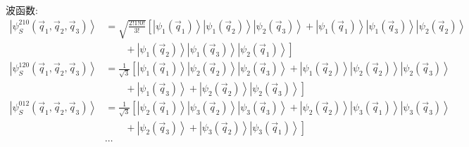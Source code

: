 \begin{frame}[label=current]
  \frametitle{}
  波函数:
  \[\begin{aligned}
    \left\vert \psi ^{210}_S(\vec{q}_1,\vec{q}_2,\vec{q}_3) \right\rangle 
    &= \sqrt{\frac{2!1!0!}{3!}} \left[\left\vert \psi _1(\vec{q}_1)\right\rangle \left\vert \psi _1(\vec{q}_2)\right\rangle \left\vert \psi _2(\vec{q}_3)\right\rangle 
    + \left\vert \psi _1(\vec{q}_1)\right\rangle \left\vert \psi _1(\vec{q}_3)\right\rangle \left\vert \psi _2(\vec{q}_2)\right\rangle \right. \\
    &  \left.\qquad + \left\vert \psi _1(\vec{q}_2)\right\rangle \left\vert \psi _1(\vec{q}_3)\right\rangle \left\vert \psi _2(\vec{q}_1)\right\rangle
    \right]\\  
    \left\vert \psi ^{120}_S(\vec{q}_1,\vec{q}_2,\vec{q}_3) \right\rangle 
    &= \frac{1}{\sqrt{3}} \left[\left\vert \psi _1(\vec{q}_1)\right\rangle \left\vert \psi _2(\vec{q}_2)\right\rangle \left\vert \psi _2(\vec{q}_3)\right\rangle 
    + \left\vert \psi _1(\vec{q}_2)\right\rangle \left\vert \psi _2(\vec{q}_2)\right\rangle \left\vert \psi _2(\vec{q}_3)\right\rangle \right. \\
    &  \left.\qquad + \left\vert \psi _1(\vec{q}_3)\right\rangle 
    + \left\vert \psi _2(\vec{q}_2)\right\rangle \left\vert \psi _2(\vec{q}_3)\right\rangle 
    \right]\\
    \left\vert \psi ^{012}_S(\vec{q}_1,\vec{q}_2,\vec{q}_3) \right\rangle 
    &= \frac{1}{\sqrt{3}} \left[\left\vert \psi _2(\vec{q}_1)\right\rangle \left\vert \psi _3(\vec{q}_2)\right\rangle \left\vert \psi _3(\vec{q}_3)\right\rangle 
    + \left\vert \psi _2(\vec{q}_2)\right\rangle \left\vert \psi _3(\vec{q}_1)\right\rangle \left\vert \psi _3(\vec{q}_3)\right\rangle \right. \\
    &  \left.\qquad + \left\vert \psi _2(\vec{q}_3)\right\rangle 
    + \left\vert \psi _3(\vec{q}_2)\right\rangle \left\vert \psi _3(\vec{q}_1)\right\rangle 
    \right] \\
    & \cdots 
  \end{aligned} \]
\end{frame} 

